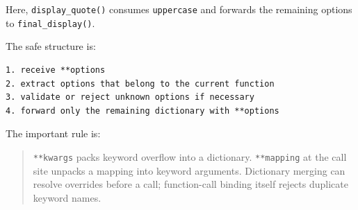 Here, \texttt{display\_quote()} consumes \texttt{uppercase} and forwards the remaining options to \texttt{final\_display()}.

The safe structure is:

\begin{verbatim}
1. receive **options
2. extract options that belong to the current function
3. validate or reject unknown options if necessary
4. forward only the remaining dictionary with **options
\end{verbatim}

The important rule is:

\begin{quote}
\texttt{**kwargs} packs keyword overflow into a dictionary. \texttt{**mapping} at the call site unpacks a mapping into keyword arguments. Dictionary merging can resolve overrides before a call; function-call binding itself rejects duplicate keyword names.
\end{quote}